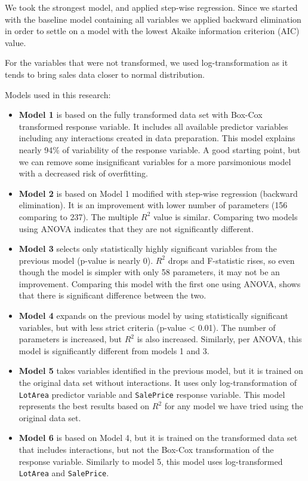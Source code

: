 \documentclass[
]{article}
\begin{document}
We took the strongest model, and applied step-wise regression. Since we
started with the baseline model containing all variables we applied
backward elimination in order to settle on a model with the lowest
Akaike information criterion (AIC) value.

For the variables that were not transformed, we used log-transformation
as it tends to bring sales data closer to normal distribution.

Models used in this research:

\begin{itemize}
\item
  \textbf{Model 1} is based on the fully transformed data set with
  Box-Cox transformed response variable. It includes all available
  predictor variables including any interactions created in data
  preparation. This model explains nearly 94\% of variability of the
  response variable. A good starting point, but we can remove some
  insignificant variables for a more parsimonious model with a decreased
  risk of overfitting.
\item
  \textbf{Model 2} is based on Model 1 modified with step-wise
  regression (backward elimination). It is an improvement with lower
  number of parameters (156 comparing to 237). The multiple \(R^2\)
  value is similar. Comparing two models using ANOVA indicates that they
  are not significantly different.
\item
  \textbf{Model 3} selects only statistically highly significant
  variables from the previous model (p-value is nearly 0). \(R^2\) drops
  and F-statistic rises, so even though the model is simpler with only
  58 parameters, it may not be an improvement. Comparing this model with
  the first one using ANOVA, shows that there is significant difference
  between the two.
\item
  \textbf{Model 4} expands on the previous model by using statistically
  significant variables, but with less strict criteria (p-value
  \textless{} 0.01). The number of parameters is increased, but \(R^2\)
  is also increased. Similarly, per ANOVA, this model is significantly
  different from models 1 and 3.
\item
  \textbf{Model 5} takes variables identified in the previous model, but
  it is trained on the original data set without interactions. It uses
  only log-transformation of \texttt{LotArea} predictor variable and
  \texttt{SalePrice} response variable. This model represents the best
  results based on \(R^2\) for any model we have tried using the
  original data set.
\item
  \textbf{Model 6} is based on Model 4, but it is trained on the
  transformed data set that includes interactions, but not the Box-Cox
  transformation of the response variable. Similarly to model 5, this
  model uses log-transformed \texttt{LotArea} and \texttt{SalePrice}.
\end{itemize}
\end{document}
